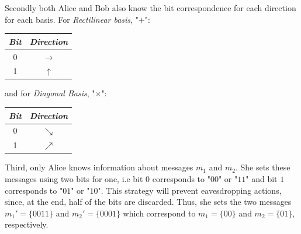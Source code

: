 Secondly both Alice and Bob also know the bit correspondence for each direction for each basis. For \textit{Rectilinear basis}, "$+$":

\begin{table}[H]
\centering
\begin{tabular}{c|c}
\textbf{\textit{Bit}}         & \textbf{\textit{Direction}} \\ \hline
 0 & $\to$ \\
 1 & $\uparrow$ \\
\end{tabular}
\end{table}

and for \textit{Diagonal Basis}, "$\times$":

\begin{table}[H]
\centering
\begin{tabular}{c|c}
\textbf{\textit{Bit}}         & \textbf{\textit{Direction}} \\ \hline
 0 & $\searrow$ \\
 1 & $\nearrow$ \\
\end{tabular}
\end{table}

Third, only Alice knows information about messages $m_{1}$ and $m_{2}$. She sets these messages using two bits for one, i.e bit $0$ corresponds to "$0 0$" or "$1 1$" and bit $1$ corresponds to "$0 1$" or "$1 0$". This strategy will prevent eavesdropping actions, since, at the end, half of the bits are discarded. Thus, she sets the two messages $m_{1}\prime = \{0 0 1 1\}$ and $m_{2}\prime = \{0 0 0 1\}$ which correspond to $m_{1} = \{0 0\}$ and $m_{2} = \{0 1\}$, respectively.


